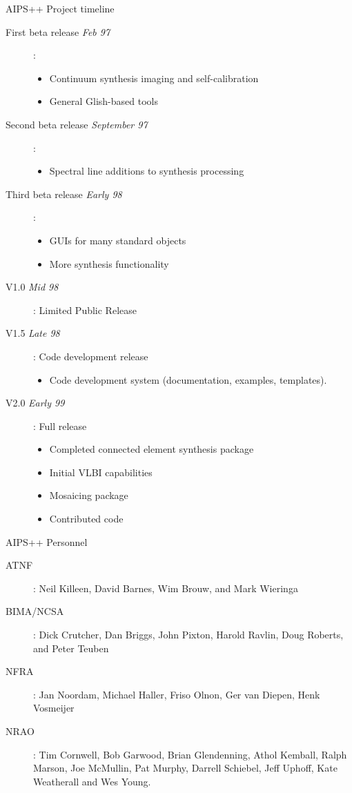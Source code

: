 \begin{slide}{AIPS++ Project timeline}
\begin{description}
\item[First beta release {\em Feb 97}]:
\begin{itemize}
\item Continuum synthesis imaging and self-calibration
\item General Glish-based tools
\end{itemize}
\item[Second beta release {\em September 97}]:
\begin{itemize}
\item Spectral line additions to synthesis processing
\end{itemize}
\item[Third beta release {\em Early 98}]:
\begin{itemize}
\item GUIs for many standard objects
\item More synthesis functionality
\end{itemize}
\item[V1.0 {\em Mid 98}]: Limited Public Release
\item[V1.5 {\em Late 98}]: Code development release
\begin{itemize}
\item Code development system (documentation, examples, templates). 
\end{itemize}
\item[V2.0 {\em Early 99}]: Full release
\begin{itemize}
\item Completed connected element synthesis package
\item Initial VLBI capabilities
\item Mosaicing package
\item Contributed code
\end{itemize}
\end{description}
\end{slide}

\begin{slide}{AIPS++ Personnel}
\begin{description}
\item[ATNF]: Neil Killeen, David Barnes, Wim Brouw, and Mark
Wieringa

\item[BIMA/NCSA]: Dick Crutcher, Dan Briggs, John Pixton,
Harold Ravlin, Doug Roberts, and Peter Teuben

\item[NFRA]:  Jan Noordam, Michael Haller, Friso Olnon, 
Ger van Diepen, Henk Vosmeijer

\item[NRAO]: Tim Cornwell, Bob Garwood, Brian
Glendenning, Athol Kemball, Ralph Marson, Joe McMullin, Pat Murphy,
Darrell Schiebel, Jeff Uphoff, Kate Weatherall and Wes Young.

\end{description}
\end{slide}

